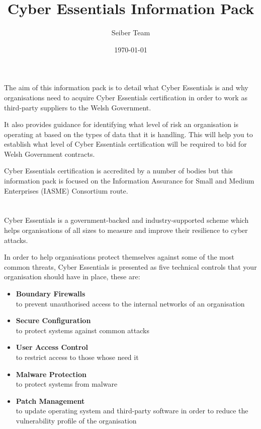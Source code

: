 \documentclass[12pt]{article}
\title{Cyber Essentials Information Pack}
\author{Seiber Team}
\date{\today}
\begin{document}

\section*{}
The aim of this information pack is to detail what Cyber Essentials is and why organisations need to acquire Cyber Essentials certification in order to work as third-party suppliers to the Welsh Government.

It also provides guidance for identifying what level of risk an organisation is operating at based on the types of data that it is handling. This will help you to establish what level of Cyber Essentials certification will be required to bid for Welsh Government contracts.

Cyber Essentials certification is accredited by a number of bodies but this information pack is focused on the Information Assurance for Small and Medium Enterprises (IASME) Consortium route.


\section*{}
Cyber Essentials is a government-backed and industry-supported scheme which helps organisations of all sizes to measure and improve their resilience to cyber attacks.

In order to help organisations protect themselves against some of the most common threats, Cyber Essentials is presented as five technical controls that your organisation should have in place, these are:
\begin{itemize}
  \item \textbf{Boundary Firewalls} \\to prevent unauthorised access to the internal networks of an organisation
  \item \textbf{Secure Configuration} \\to protect systems against common attacks
  \item \textbf{User Access Control} \\to restrict access to those whose need it
  \item \textbf{Malware Protection} \\to protect systems from malware
  \item \textbf{Patch Management} \\to update operating system and third-party software in order to reduce the vulnerability profile of the organisation
\end{itemize}
\end{document}
